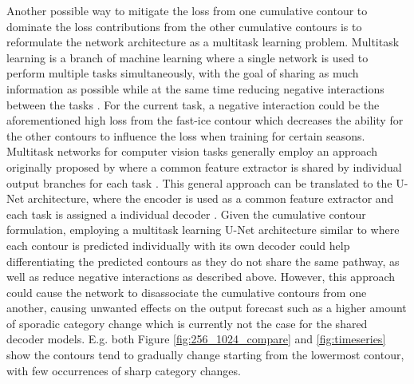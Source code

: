 \documentclass[../main/thesis]{subfiles}
\begin{document}
Another possible way to mitigate the loss from one cumulative contour to dominate the loss contributions from the other cumulative contours is to reformulate the network architecture as a multitask learning problem. Multitask learning is a branch of machine learning where a single network is used to perform multiple tasks simultaneously, with the goal of sharing as much information as possible while at the same time reducing negative interactions between the tasks \citep{Crawshaw2020}. For the current task, a negative interaction could be the aforementioned high loss from the fast-ice contour which decreases the ability for the other contours to influence the loss when training for certain seasons. Multitask networks for computer vision tasks generally employ an approach originally proposed by \citet{Zhang2014} where a common feature extractor is shared by individual output branches for each task \citep{Crawshaw2020}. This general approach can be translated to the U-Net architecture, where the encoder is used as a common feature extractor and each task is assigned a individual decoder \citep{Jha2020}. Given the cumulative contour formulation, employing a multitask learning U-Net architecture similar to \citet{Jha2020} where each contour is predicted individually with its own decoder could help differentiating the predicted contours as they do not share the same pathway, as well as reduce negative interactions as described above. However, this approach could cause the network to disassociate the cumulative contours from one another, causing unwanted effects on the output forecast such as a higher amount of sporadic category change which is currently not the case for the shared decoder models. E.g. both Figure \ref{fig:256_1024_compare} and \ref{fig:timeseries} show the contours tend to gradually change starting from the lowermost contour, with few occurrences of sharp category changes.
\end{document}
